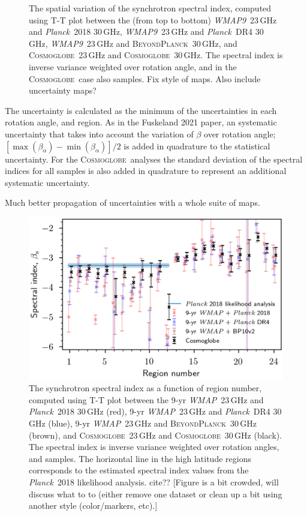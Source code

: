 \documentclass[twocolumn]{../../common/aa}
\def\WMAP{\emph{WMAP}}
\def\WMAPnine{\emph{WMAP9}}
\def\Planck{\emph{Planck}}
\newcommand{\red}[0]{\color{red}}
\newcommand{\BP}{\textsc{BeyondPlanck}}
\newcommand{\Cosmoglobe}{\textsc{Cosmoglobe}}
\begin{document}
\begin{figure}
        \caption{The spatial variation of the synchrotron spectral index, computed using T-T plot between the (from top to bottom) \WMAPnine\ 23\,GHz and \Planck\ 2018 30\,GHz, \WMAPnine\ 23\,GHz and \Planck\ DR4 30\,GHz, \WMAPnine\ 23\,GHz and \BP\ 30\,GHz, and \Cosmoglobe\ 23\,GHz and \Cosmoglobe\ 30\,GHz. The spectral index is inverse variance weighted over rotation angle, and in the \Cosmoglobe\ case also samples. {\red Fix style of maps. Also include uncertainty maps?}}
        \label{fig:cos20_beta_map}
\end{figure}

The uncertainty is calculated as the minimum of the uncertainties in each rotation angle, and region. As in the Fuskeland 2021 paper, an systematic uncertainty that takes into account the variation of $\beta$ over rotation angle; $[ \max(\beta_\alpha) - \min(\beta_\alpha) ] /2$ is added in quadrature to the statistical uncertainty.
For the \Cosmoglobe\ analyses the standard deviation of the spectral indices for all samples is also added in quadrature to represent an additional systematic uncertainty.

Much better propagation of uncertainties with a whole suite of maps.

\begin{figure}
        \centering
        \includegraphics[width=\linewidth]{figures/cos30_region_beta_cosmoglobe_vs_wmap_all.png}
        \caption{The synchrotron spectral index as a function of region number, computed using T-T plot between the 9-yr \WMAP\ 23\,GHz and \Planck\ 2018 30\,GHz (red), 9-yr \WMAP\ 23\,GHz and \Planck\ DR4 30\,GHz (blue), 9-yr \WMAP\ 23\,GHz and \BP\ 30\,GHz (brown), and \Cosmoglobe\ 23\,GHz and \Cosmoglobe\ 30\,GHz (black). The spectral index is inverse variance weighted over rotation angles, and samples. The horizontal line in the high latitude regions corresponds to the estimated spectral index values from the \Planck\ 2018 likelihood analysis. cite?? {\red [Figure is a bit crowded, will discuss what to to (either remove one dataset or clean up a bit using another style (color/markers, etc).]}}
        \label{fig:cos30_beta_region}
\end{figure}
\end{document}
